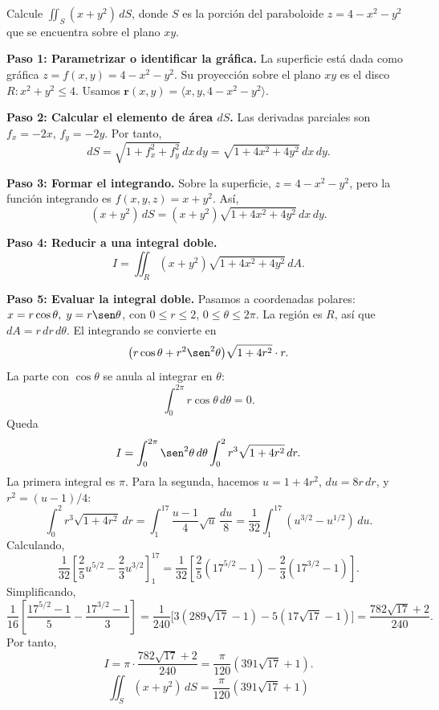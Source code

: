 \begin{example}
Calcule $\displaystyle \iint_S (x+y^2)\,dS$, donde $S$ es la porción del paraboloide $z=4-x^2-y^2$ que se encuentra sobre el plano $xy$.
\begin{myproof}
\textbf{Paso 1: Parametrizar o identificar la gráfica.}
La superficie está dada como gráfica $z=f(x,y)=4-x^2-y^2$. Su proyección sobre el plano $xy$ es el disco $R: x^2+y^2 \le 4$. Usamos $\mathbf{r}(x,y)=\langle x,y,4-x^2-y^2\rangle$.

\textbf{Paso 2: Calcular el elemento de área $dS$.}
Las derivadas parciales son $f_x=-2x$, $f_y=-2y$. Por tanto,
\[
dS = \sqrt{1+f_x^2+f_y^2}\,dx\,dy
= \sqrt{1+4x^2+4y^2}\,dx\,dy.
\]

\textbf{Paso 3: Formar el integrando.}
Sobre la superficie, $z=4-x^2-y^2$, pero la función integrando es $f(x,y,z)=x+y^2$. Así,
\[
(x+y^2)\,dS = (x+y^2)\sqrt{1+4x^2+4y^2}\,dx\,dy.
\]

\textbf{Paso 4: Reducir a una integral doble.}
\[
I = \iint_R (x+y^2)\sqrt{1+4x^2+4y^2}\,dA.
\]

\textbf{Paso 5: Evaluar la integral doble.}
Pasamos a coordenadas polares: $x=r\cos\theta,\; y=r\sen\theta$, con $0\le r\le 2$, $0\le\theta\le 2\pi$. La región es $R$, así que $dA = r\,dr\,d\theta$. El integrando se convierte en
\[
\bigl(r\cos\theta + r^2\sen^2\theta\bigr)\sqrt{1+4r^2}\cdot r.
\]
La parte con $\cos\theta$ se anula al integrar en $\theta$:
\[
\int_0^{2\pi} r\cos\theta \, d\theta = 0.
\]
Queda
\[
I = \int_0^{2\pi}\sen^2\theta\,d\theta \int_0^2 r^3\sqrt{1+4r^2}\,dr.
\]
La primera integral es $\pi$. Para la segunda, hacemos $u=1+4r^2$, $du=8r\,dr$, y $r^2=(u-1)/4$:
\[
\int_0^2 r^3\sqrt{1+4r^2}\,dr
= \int_1^{17} \frac{u-1}{4}\sqrt{u}\,\frac{du}{8}
= \frac{1}{32}\int_1^{17} (u^{3/2}-u^{1/2})\,du.
\]
Calculando,
\[
\frac{1}{32}\left[\frac{2}{5}u^{5/2}-\frac{2}{3}u^{3/2}\right]_1^{17}
= \frac{1}{32}\left[\frac{2}{5}(17^{5/2}-1)-\frac{2}{3}(17^{3/2}-1)\right].
\]
Simplificando,
\[
\frac{1}{16}\left[\frac{17^{5/2}-1}{5}-\frac{17^{3/2}-1}{3}\right]
= \frac{1}{240}\bigl[3(289\sqrt{17}-1)-5(17\sqrt{17}-1)\bigr]
= \frac{782\sqrt{17}+2}{240}.
\]
Por tanto,
\[
I = \pi \cdot \frac{782\sqrt{17}+2}{240}
= \frac{\pi}{120}(391\sqrt{17}+1).
\]
\[
\boxed{\displaystyle \iint_S (x+y^2)\,dS = \frac{\pi}{120}(391\sqrt{17}+1)}
\]
\end{myproof}
\end{example}

